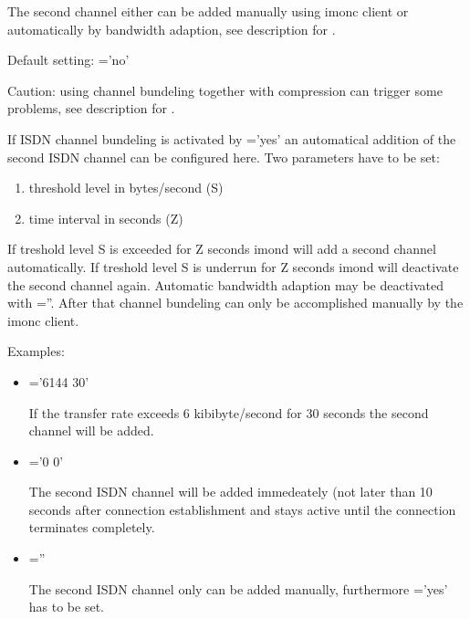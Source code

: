 \begin{description}
  The second channel either can be added manually using imonc client or 
  automatically by bandwidth adaption, see description for
  .
  
  Default setting: ='no'
  
  Caution: using channel bundeling together with compression can trigger 
  some problems, see description for .

  
If ISDN channel bundeling is activated by \linebreak
{}='yes' an automatical addition of 
the second ISDN channel can be configured here. Two parameters have to be set:
  \begin{enumerate}
  \item  threshold level in bytes/second (S)
  \item  time interval in seconds (Z)
  \end{enumerate}
  
  If treshold level S is exceeded for Z seconds imond will add a second 
  channel automatically. If treshold level S is underrun for Z seconds 
  imond will deactivate the second channel again. Automatic bandwidth 
  adaption may be deactivated with =''. 
  After that channel bundeling can only be accomplished manually by the 
  imonc client.
  
  Examples:
  \begin{itemize}
  \item {}='6144 30'
    
    If the transfer rate exceeds 6 kibibyte/second for 30 seconds 
    the second channel will be added.
    
  \item {}='0 0'
    
    The second ISDN channel will be added immedeately (not later than 10 
    seconds after connection establishment and stays active until the connection 
    terminates completely.
    
  \item {}=''
    
    The second ISDN channel only can be added manually, furthermore
    ='yes' has to be set.
    

\end{itemize}
\end{description}
